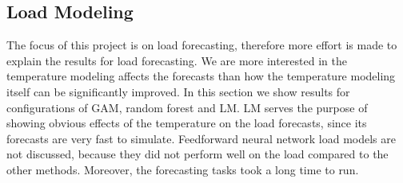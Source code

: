 \documentclass[conference]{IEEEtran}
\begin{document}
\subsection{Load Modeling}
The focus of this project is on load forecasting, therefore more effort is made to explain the results for load forecasting. We are more interested in the temperature modeling affects the forecasts than how the temperature modeling itself can be significantly improved. In this section we show results for configurations of GAM, random forest and LM. LM serves the purpose of showing obvious effects of the temperature on the load forecasts, since its forecasts are very fast to simulate. Feedforward neural network load  models are not discussed, because they did not perform well on the load compared to the other methods. Moreover, the forecasting tasks took a long time to run. 
\end{document}

